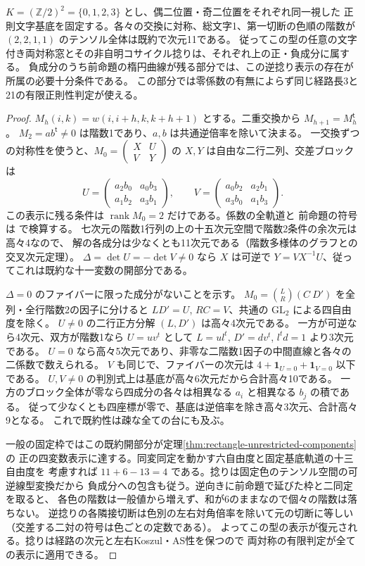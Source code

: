 \begin{theorem}\label{thm:klein-bisymmetric-irreducible}
$K=(\mathbb Z/2)^2=\{0,1,2,3\}$ とし、偶二位置・奇二位置をそれぞれ同一視した
正則文字基底を固定する。各々の交換に対称、総文字1、第一切断の色順の階数が
$(2,2,1,1)$ のテンソル全体は既約で次元11である。
従ってこの型の任意の文字付き両対称窓とその非自明コサイクル捻りは、それぞれ上の正・負成分に属する。
負成分のうち前命題の楕円曲線が残る部分では、この逆捻り表示の存在が所属の必要十分条件である。
この部分では零係数の有無によらず同じ経路長3と21の有限正則性判定が使える。
\end{theorem}
\begin{proof}
$M_h(i,k)=w(i,i+h,k,k+h+1)$ とする。二重交換から $M_{h+1}=M_h^{\mathsf t}$。
$M_2=ab^{\mathsf t}\ne0$ は階数1であり、$a,b$ は共通逆倍率を除いて決まる。
一交換ずつの対称性を使うと、$M_0=\left(\begin{smallmatrix}X&U\\V&Y\end{smallmatrix}\right)$ の
$X,Y$ は自由な二行二列、交差ブロックは
\[
 U=\begin{pmatrix}a_2b_0&a_0b_3\\a_1b_2&a_3b_1\end{pmatrix},\qquad
 V=\begin{pmatrix}a_0b_2&a_2b_1\\a_3b_0&a_1b_3\end{pmatrix}.
\]
この表示に残る条件は $\operatorname{rank}M_0=2$ だけである。係数の全軌道と
前命題の符号は  で検算する。
七次元の階数1行列の上の十五次元空間で階数2条件の余次元は高々4なので、
解の各成分は少なくとも11次元である（階数多様体のグラフとの交叉次元定理）。
$\Delta=\det U=-\det V\ne0$ なら $X$ は可逆で $Y=VX^{-1}U$、従ってこれは既約な十一変数の開部分である。

$\Delta=0$ のファイバーに限った成分がないことを示す。
$M_0=\binom{L}{R}(C\ D')$ を全列・全行階数2の因子に分けると
$LD'=U$, $RC=V$、共通の $\mathrm{GL}_2$ による四自由度を除く。
$U\ne0$ の二行正方分解 $(L,D')$ は高々4次元である。
一方が可逆なら4次元、双方が階数1なら $U=uv^t$ として
$L=ul^t$, $D'=dv^t$, $l^t d=1$ より3次元である。
$U=0$ なら高々5次元であり、非零な二階数1因子の中間直線と各々の二係数で数えられる。
$V$ も同じで、ファイバーの次元は $4+\mathbf1_{U=0}+\mathbf1_{V=0}$ 以下である。
$U,V\ne0$ の判別式上は基底が高々6次元だから合計高々10である。
一方のブロック全体が零なら四成分の各々は相異なる $a_i$ と相異なる $b_j$ の積である。
従って少なくとも四座標が零で、基底は逆倍率を除き高々3次元、合計高々9となる。
これで既約性は疎な全ての台にも及ぶ。

一般の固定枠ではこの既約開部分が定理\ref{thm:rectangle-unrestricted-components}の
正の四変数表示に達する。同変同定を動かす六自由度と固定基底軌道の十三自由度を
考慮すれば $11+6-13=4$ である。捻りは固定色のテンソル空間の可逆線型変換だから
負成分への包含も従う。逆向きに前命題で延びた枠と二同定を取ると、
各色の階数は一般値から増えず、和が6のままなので個々の階数は落ちない。
逆捻りの各隣接切断は色別の左右対角倍率を除いて元の切断に等しい
（交差する二対の符号は色ごとの定数である）。
よってこの型の表示が復元される。捻りは経路の次元と左右Koszul・AS性を保つので
両対称の有限判定が全ての表示に適用できる。
\end{proof}

